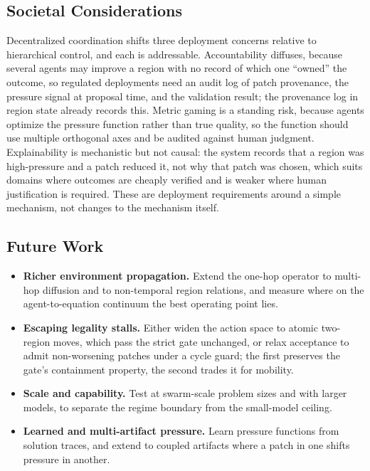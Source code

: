 \subsection{Societal Considerations}

Decentralized coordination shifts three deployment concerns relative to hierarchical control, and each is addressable. Accountability diffuses, because several agents may improve a region with no record of which one ``owned'' the outcome, so regulated deployments need an audit log of patch provenance, the pressure signal at proposal time, and the validation result; the provenance log in region state already records this. Metric gaming is a standing risk, because agents optimize the pressure function rather than true quality, so the function should use multiple orthogonal axes and be audited against human judgment. Explainability is mechanistic but not causal: the system records that a region was high-pressure and a patch reduced it, not why that patch was chosen, which suits domains where outcomes are cheaply verified and is weaker where human justification is required. These are deployment requirements around a simple mechanism, not changes to the mechanism itself.

\subsection{Future Work}

\begin{itemize}
\item \textbf{Richer environment propagation.} Extend the one-hop operator to multi-hop diffusion and to non-temporal region relations, and measure where on the agent-to-equation continuum the best operating point lies.
\item \textbf{Escaping legality stalls.} Either widen the action space to atomic two-region moves, which pass the strict gate unchanged, or relax acceptance to admit non-worsening patches under a cycle guard; the first preserves the gate's containment property, the second trades it for mobility.
\item \textbf{Scale and capability.} Test at swarm-scale problem sizes and with larger models, to separate the regime boundary from the small-model ceiling.
\item \textbf{Learned and multi-artifact pressure.} Learn pressure functions from solution traces, and extend to coupled artifacts where a patch in one shifts pressure in another.
\end{itemize}
